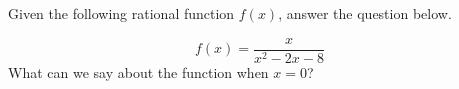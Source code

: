 \documentclass{ximera}
\author{David Kish}
\begin{document}
Given the following rational function $f(x)$, answer the question below.
\begin{exercise}
\[
f(x)=\frac{x}{x^2-2x-8}
\]
What can we say about the function when $x=0$?
\begin{multipleChoice}  
\end{multipleChoice}  
\end{exercise}
\end{document}
